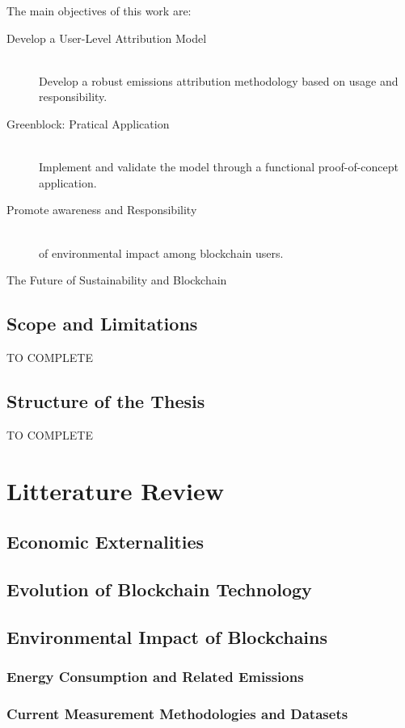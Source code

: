 \documentclass[11pt]{report}
\begin{document}
The main objectives of this work are:

\begin{description}

    \item [Develop a User-Level Attribution Model] \hfill \\
    Develop a robust emissions attribution methodology based on usage and responsibility. 
    \item [Greenblock: Pratical Application] \hfill \\
    Implement and validate the model through a functional proof-of-concept application.
    \item [Promote awareness and Responsibility] \hfill \\
    of environmental impact among blockchain users.
    \item [The Future of Sustainability and Blockchain] 
\end{description}

\section{Scope and Limitations}
TO COMPLETE


\section{Structure of the Thesis}
TO COMPLETE

\chapter{Litterature Review}
\section{Economic Externalities}
\section{Evolution of Blockchain Technology}
\section{Environmental Impact of Blockchains}
\subsection{Energy Consumption and Related Emissions}
\subsection{Current Measurement Methodologies and Datasets}
\end{document}
